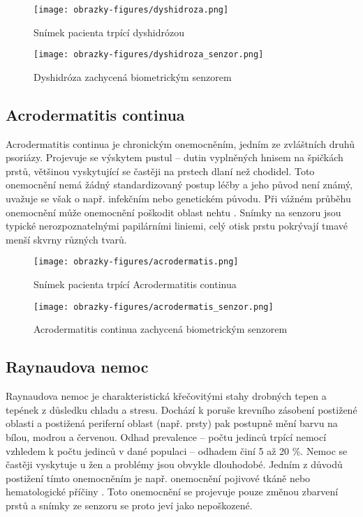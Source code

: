 \begin{figure}[!htbp]
  \begin{minipage}[b]{0.5\linewidth}
    \centering
    \texttt{[image: obrazky-figures/dyshidroza.png]}
    \caption{Snímek pacienta trpící dyshidrózou \cite{InfluenceSkinDiseases}}
  \end{minipage}
  \hspace{0.5cm}
  \begin{minipage}[b]{0.5\linewidth}
    \centering
    \texttt{[image: obrazky-figures/dyshidroza\_senzor.png]}
    \caption{Dyshidróza zachycená biometrickým senzorem \cite{Barotova}}
  \end{minipage}
\end{figure}

\subsection*{Acrodermatitis continua}
Acrodermatitis continua je chronickým onemocněním, jedním ze zvláštních druhů psoriázy. Projevuje se výskytem pustul -- dutin vyplněných hnisem na špičkách prstů, většinou vyskytující se častěji na prstech dlaní než chodidel. Toto onemocnění nemá žádný standardizovaný postup léčby a jeho původ není známý, uvažuje se však o např. infekčním nebo genetickém původu. Při vážném průběhu onemocnění může onemocnění poškodit oblast nehtu \cite{AcrodermatitisContinua}. Snímky na senzoru jsou typické nerozpoznatelnými papilárními liniemi, celý otisk prstu pokrývají tmavé menší skvrny různých tvarů.

\begin{figure}[!htbp]
  \begin{minipage}[b]{0.5\linewidth}
    \centering
    \texttt{[image: obrazky-figures/acrodermatis.png]}
    \caption{Snímek pacienta trpící Acrodermatitis continua \cite{AcrodermatitisContinua}}
  \end{minipage}
  \hspace{0.5cm}
  \begin{minipage}[b]{0.5\linewidth}
    \centering
    \texttt{[image: obrazky-figures/acrodermatis\_senzor.png]}
    \caption{Acrodermatitis continua zachycená biometrickým senzorem \cite{Barotova}}
  \end{minipage}
\end{figure}

\subsection*{Raynaudova nemoc}
Raynaudova nemoc je charakteristická křečovitými stahy drobných tepen a tepének z důsledku chladu a stresu. Dochází k poruše krevního zásobení postižené oblasti a postižená periferní oblast (např. prsty) pak postupně mění barvu na bílou, modrou a červenou. Odhad prevalence -- počtu jedinců trpící nemocí vzhledem k počtu jedinců v dané populaci -- odhadem činí 5 až 20 \%. Nemoc se častěji vyskytuje u žen a problémy jsou obvykle dlouhodobé. Jedním z důvodů postižení tímto onemocněním je např. onemocnění pojivové tkáně nebo hematologické příčiny \cite{InfluenceSkinDiseases}. Toto onemocnění se projevuje pouze změnou zbarvení prstů a snímky ze senzoru se proto jeví jako nepoškozené.

